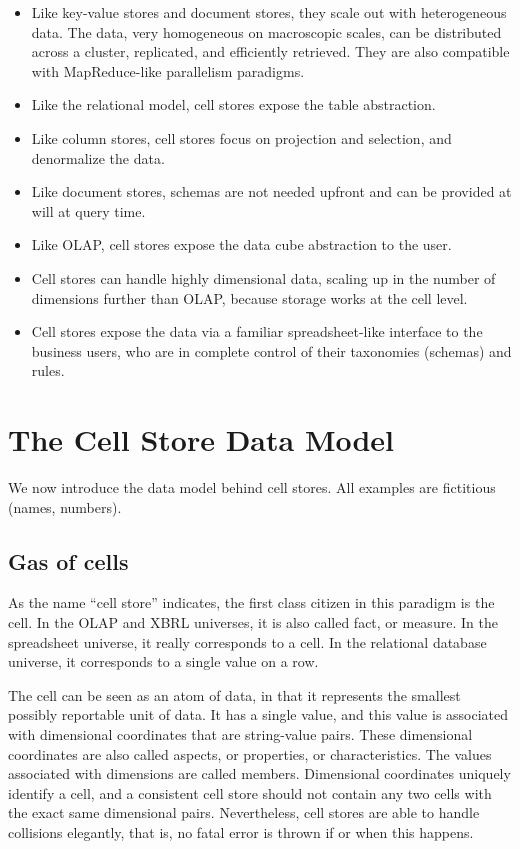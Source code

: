 \documentclass{acm_proc_article-sp}
\begin{document}
\begin{itemize}
\item Like key-value stores and document stores, they scale out with heterogeneous data. The data, very homogeneous on macroscopic scales, can be distributed across a cluster, replicated, and efficiently retrieved. They are also compatible with MapReduce-like parallelism paradigms.
\item Like the relational model, cell stores expose the table abstraction.
\item Like column stores, cell stores focus on projection and selection, and denormalize the data. 
\item Like document stores, schemas are not needed upfront and can be provided at will at query time.
\item Like OLAP, cell stores expose the data cube abstraction to the user.
\item Cell stores can handle highly dimensional data, scaling up in the number of dimensions further than OLAP, because storage works at the cell level.
\item Cell stores expose the data via a familiar spreadsheet-like interface to the business users, who are in complete control of their taxonomies (schemas) and rules.
\end{itemize}

\section{The Cell Store Data Model}
\label{section-data-model}

We now introduce the data model behind cell stores. All examples are fictitious (names, numbers).

\subsection{Gas of cells}

As the name ``cell store'' indicates, the first class citizen in this paradigm is the cell. In the OLAP and XBRL \cite{XBRL} universes, it is also called fact, or measure. In the spreadsheet universe, it really corresponds to a cell. In the relational database universe, it corresponds to a single value on a row.

The cell can be seen as an atom of data, in that it represents the smallest possibly reportable unit of data. It has a single value, and this value is associated with dimensional coordinates that are string-value pairs. These dimensional coordinates are also called aspects, or properties, or characteristics. The values associated with dimensions are called members. Dimensional coordinates uniquely identify a cell, and a consistent cell store should not contain any two cells with the exact same dimensional pairs. Nevertheless, cell stores are able to handle collisions elegantly, that is, no fatal error is thrown if or when this happens.
\end{document}
